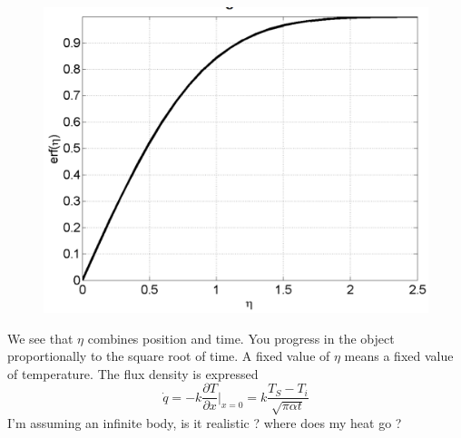 		\begin{figure}
		\vspace{-5mm}
		\includegraphics[scale=0.2]{ch4/3}
		\end{figure}	
		We see that $\eta$ combines position and time. You progress in the object proportionally to the square root of time. A fixed value of $\eta$ means a fixed value of temperature. The flux density is expressed 
		\begin{equation}
			\dot{q} = -k \frac{\partial T }{\partial x }| _{x=0} = k \frac{T_S-T_i}{\sqrt{\pi \alpha t}}
		\end{equation}
I'm assuming an infinite body, is it realistic ? where does my heat go ?

